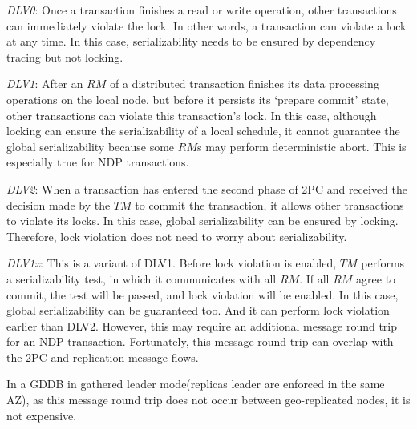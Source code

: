 \documentclass[conference]{IEEEtran}
\begin{document}
\emph{DLV0}:
Once a transaction finishes a read or write operation, other transactions can immediately violate the lock.
In other words, a transaction can violate a lock at any time.
In this case, serializability needs to be ensured by dependency tracing but not locking.

\emph{DLV1}:
After an ${RM}$ of a distributed transaction finishes its data processing operations on the local node, but before it persists its `prepare commit' state, other transactions can violate this transaction's lock.
In this case, although locking can ensure the serializability of a local schedule, it cannot guarantee the global serializability because some ${RM}$s may perform deterministic abort.
This is especially true for NDP transactions.

\emph{DLV2}:
When a transaction has entered the second phase of 2PC and received the decision made by the ${TM}$ to commit the transaction, it allows other transactions to violate its locks.
In this case, global serializability can be ensured by locking. Therefore, lock violation does not need to worry about serializability.

\emph{DLV1x}:
This is a variant of DLV1.
Before lock violation is enabled, ${TM}$ performs a serializability test, in which it communicates with all ${RM}$.
If all ${RM}$ agree to commit, the test will be passed, and lock violation will be enabled.
In this case, global serializability can be guaranteed too. And it can perform lock violation earlier than DLV2.
However, this may require an additional message round trip for an NDP transaction.
Fortunately, this message round trip can overlap with the 2PC and replication message flows.

In a GDDB in gathered leader mode(replicas leader are enforced in the same AZ), as this message round trip does not occur between geo-replicated nodes, it is not expensive.
\end{document}
